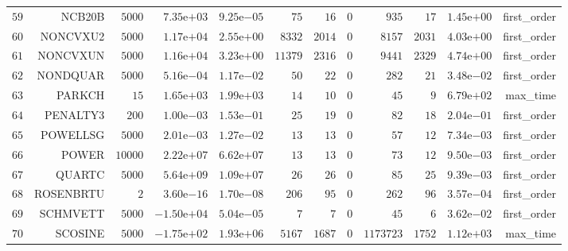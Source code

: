 \begin{longtable}{rrrrrrrrrrrr}
  \(    59\) & NCB20B & \(  5000\) & \( 7.35\)e\(+03\) & \( 9.25\)e\(-05\) & \(    75\) & \(    16\) & \(     0\) & \(   935\) & \(    17\) & \( 1.45\)e\(+00\) & first\_order \\
  \(    60\) & NONCVXU2 & \(  5000\) & \( 1.17\)e\(+04\) & \( 2.55\)e\(+00\) & \(  8332\) & \(  2014\) & \(     0\) & \(  8157\) & \(  2031\) & \( 4.03\)e\(+00\) & first\_order \\
  \(    61\) & NONCVXUN & \(  5000\) & \( 1.16\)e\(+04\) & \( 3.23\)e\(+00\) & \( 11379\) & \(  2316\) & \(     0\) & \(  9441\) & \(  2329\) & \( 4.74\)e\(+00\) & first\_order \\
  \(    62\) & NONDQUAR & \(  5000\) & \( 5.16\)e\(-04\) & \( 1.17\)e\(-02\) & \(    50\) & \(    22\) & \(     0\) & \(   282\) & \(    21\) & \( 3.48\)e\(-02\) & first\_order \\
  \(    63\) & PARKCH & \(    15\) & \( 1.65\)e\(+03\) & \( 1.99\)e\(+03\) & \(    14\) & \(    10\) & \(     0\) & \(    45\) & \(     9\) & \( 6.79\)e\(+02\) & max\_time \\
  \(    64\) & PENALTY3 & \(   200\) & \( 1.00\)e\(-03\) & \( 1.53\)e\(-01\) & \(    25\) & \(    19\) & \(     0\) & \(    82\) & \(    18\) & \( 2.04\)e\(-01\) & first\_order \\
  \(    65\) & POWELLSG & \(  5000\) & \( 2.01\)e\(-03\) & \( 1.27\)e\(-02\) & \(    13\) & \(    13\) & \(     0\) & \(    57\) & \(    12\) & \( 7.34\)e\(-03\) & first\_order \\
  \(    66\) & POWER & \( 10000\) & \( 2.22\)e\(+07\) & \( 6.62\)e\(+07\) & \(    13\) & \(    13\) & \(     0\) & \(    73\) & \(    12\) & \( 9.50\)e\(-03\) & first\_order \\
  \(    67\) & QUARTC & \(  5000\) & \( 5.64\)e\(+09\) & \( 1.09\)e\(+07\) & \(    26\) & \(    26\) & \(     0\) & \(    85\) & \(    25\) & \( 9.39\)e\(-03\) & first\_order \\
  \(    68\) & ROSENBRTU & \(     2\) & \( 3.60\)e\(-16\) & \( 1.70\)e\(-08\) & \(   206\) & \(    95\) & \(     0\) & \(   262\) & \(    96\) & \( 3.57\)e\(-04\) & first\_order \\
  \(    69\) & SCHMVETT & \(  5000\) & \(-1.50\)e\(+04\) & \( 5.04\)e\(-05\) & \(     7\) & \(     7\) & \(     0\) & \(    45\) & \(     6\) & \( 3.62\)e\(-02\) & first\_order \\
  \(    70\) & SCOSINE & \(  5000\) & \(-1.75\)e\(+02\) & \( 1.93\)e\(+06\) & \(  5167\) & \(  1687\) & \(     0\) & \(1173723\) & \(  1752\) & \( 1.12\)e\(+03\) & max\_time \\

\end{longtable}

